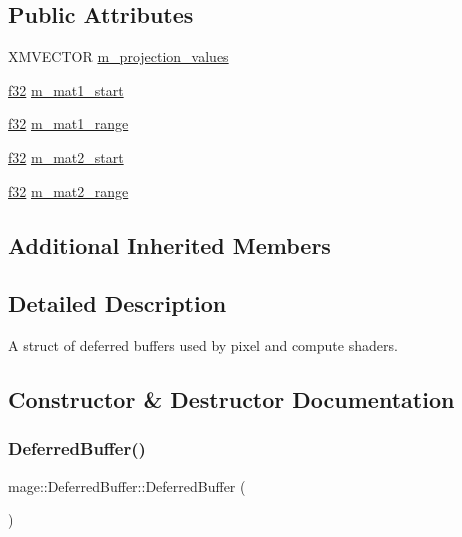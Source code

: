 \subsection*{Public Attributes}
\begin{DoxyCompactItemize}
\item 
X\+M\+V\+E\+C\+T\+OR \hyperlink{structmage_1_1_deferred_buffer_a7af6a3b361e4cfa5c29349b4a6b2823b}{m\+\_\+projection\+\_\+values}
\item 
\hyperlink{namespacemage_a6a44ad388483959dc4dff9f2aef91431}{f32} \hyperlink{structmage_1_1_deferred_buffer_acc1e2286c0c01a7464095d11add4d9ab}{m\+\_\+mat1\+\_\+start}
\item 
\hyperlink{namespacemage_a6a44ad388483959dc4dff9f2aef91431}{f32} \hyperlink{structmage_1_1_deferred_buffer_a97df9b9ee6c5e37dc30f4c5eb7cf95c2}{m\+\_\+mat1\+\_\+range}
\item 
\hyperlink{namespacemage_a6a44ad388483959dc4dff9f2aef91431}{f32} \hyperlink{structmage_1_1_deferred_buffer_ae43c623836d8372be8d8ac40349ac156}{m\+\_\+mat2\+\_\+start}
\item 
\hyperlink{namespacemage_a6a44ad388483959dc4dff9f2aef91431}{f32} \hyperlink{structmage_1_1_deferred_buffer_a5899e6e83e50bd5a31b61489a19415d0}{m\+\_\+mat2\+\_\+range}
\end{DoxyCompactItemize}
\subsection*{Additional Inherited Members}


\subsection{Detailed Description}
A struct of deferred buffers used by pixel and compute shaders. 

\subsection{Constructor \& Destructor Documentation}
\hypertarget{structmage_1_1_deferred_buffer_a98f0859ebb636565f313078bb16bcc83}{}\label{structmage_1_1_deferred_buffer_a98f0859ebb636565f313078bb16bcc83} 
\subsubsection{\texorpdfstring{Deferred\+Buffer()}{DeferredBuffer()}\hspace{0.1cm}{\footnotesize\ttfamily [1/3]}}
{\footnotesize\ttfamily mage\+::\+Deferred\+Buffer\+::\+Deferred\+Buffer (\begin{DoxyParamCaption}{ }\end{DoxyParamCaption})}

